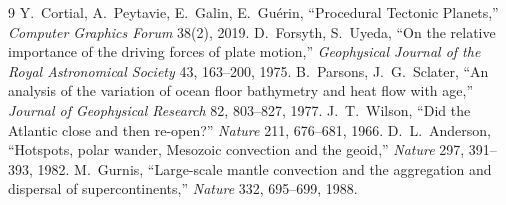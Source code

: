 \documentclass[11pt,a4paper]{article}
\begin{document}
\begin{thebibliography}{9}
 Y.~Cortial, A.~Peytavie, E.~Galin, E.~Gu\'erin,
``Procedural Tectonic Planets,'' \emph{Computer Graphics Forum} 38(2), 2019.
 D.~Forsyth, S.~Uyeda, ``On the relative importance of the
driving forces of plate motion,'' \emph{Geophysical Journal of the Royal
Astronomical Society} 43, 163--200, 1975.
 B.~Parsons, J.~G.~Sclater, ``An analysis of the variation of
ocean floor bathymetry and heat flow with age,'' \emph{Journal of Geophysical
Research} 82, 803--827, 1977.
 J.~T.~Wilson, ``Did the Atlantic close and then re-open?''
\emph{Nature} 211, 676--681, 1966.
 D.~L.~Anderson, ``Hotspots, polar wander, Mesozoic
convection and the geoid,'' \emph{Nature} 297, 391--393, 1982.
 M.~Gurnis, ``Large-scale mantle convection and the
aggregation and dispersal of supercontinents,'' \emph{Nature} 332, 695--699,
1988.
\end{thebibliography}
\end{document}

